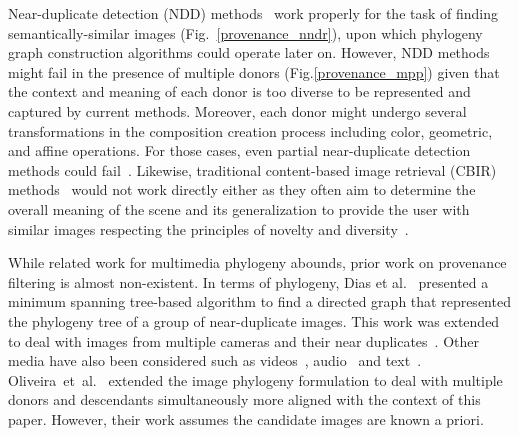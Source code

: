 Near-duplicate detection (NDD) methods~\cite{Ke_2004,Zhou:MM:2010,Tang:ICIP:2015,Yuan:ICIP:2015, Zeng:ICIP:2016} work properly for the task of finding semantically-similar images (Fig.~\ref{provenance_nndr}), upon which phylogeny graph construction algorithms could operate later on. However, NDD methods might fail in the presence of multiple donors (Fig.\ref{provenance_mpp}) given that the context and meaning of each donor is too diverse to be represented and captured by current methods. Moreover, each donor might undergo several transformations in the composition creation process including color, geometric, and affine operations. For those cases, even partial near-duplicate detection methods could fail~\cite{Dong:ICMR:2012}. Likewise, traditional content-based image retrieval (CBIR) methods~\cite{Datta_2008} would not work directly either as they often aim to determine the overall meaning of the scene and its generalization to provide the user with similar images respecting the principles of novelty and diversity~\cite{Deselaers_2009}. 

While related work for multimedia phylogeny abounds, prior work on  provenance filtering is almost non-existent. In terms of phylogeny, Dias et al.~\cite{Dias_2012} presented a minimum spanning tree-based algorithm to find a directed graph that represented the phylogeny tree of a group of near-duplicate images. This work was extended to deal with images from multiple cameras and their near duplicates~\cite{Dias_2013}. Other media have also been considered such as videos~\cite{Dias_2011,Lameri_2014}, audio~\cite{Nucci_2013} and text~\cite{Andrews_2012}. Oliveira~et~al.~\cite{Oliveira_2016} extended the image phylogeny formulation to deal with multiple donors and descendants simultaneously more aligned with the context of this paper. However, their work assumes the candidate images are known a priori.  

